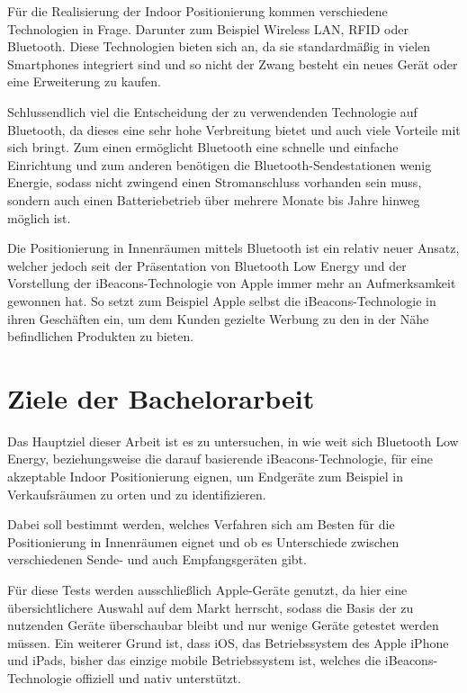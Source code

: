 Für die Realisierung der Indoor Positionierung kommen verschiedene Technologien in Frage. Darunter zum Beispiel Wireless LAN, RFID oder Bluetooth.
Diese Technologien bieten sich an, da sie standardmäßig in vielen Smartphones integriert sind und so nicht der Zwang besteht ein neues Gerät oder eine Erweiterung zu kaufen.


Schlussendlich viel die Entscheidung der zu verwendenden Technologie auf Bluetooth, da dieses eine sehr hohe Verbreitung bietet und auch viele Vorteile mit sich bringt. Zum einen ermöglicht Bluetooth eine schnelle und einfache Einrichtung und zum anderen benötigen die Bluetooth-Sendestationen wenig Energie, sodass nicht zwingend einen Stromanschluss vorhanden sein muss, sondern auch einen Batteriebetrieb über mehrere Monate bis Jahre hinweg möglich ist.

Die Positionierung in Innenräumen mittels Bluetooth ist ein relativ neuer Ansatz, welcher jedoch seit der Präsentation von Bluetooth Low Energy und der Vorstellung der iBeacons-Technologie von Apple immer mehr an Aufmerksamkeit gewonnen hat. So setzt zum Beispiel Apple selbst die iBeacons-Technologie in ihren Geschäften ein, um dem Kunden gezielte Werbung zu den in der Nähe befindlichen Produkten zu bieten.

\section{Ziele der Bachelorarbeit}
\label{sec:introduction:goal}


Das Hauptziel dieser Arbeit ist es zu untersuchen, in wie weit sich Bluetooth Low Energy, beziehungsweise die darauf basierende iBeacons-Technologie, für eine akzeptable Indoor Positionierung eignen, um Endgeräte zum Beispiel in Verkaufsräumen zu orten und zu identifizieren.

Dabei soll bestimmt werden, welches Verfahren sich am Besten für die Positionierung in Innenräumen eignet und ob es Unterschiede zwischen verschiedenen Sende- und auch Empfangsgeräten gibt.

Für diese Tests werden ausschließlich Apple-Geräte genutzt, da hier eine übersichtlichere Auswahl auf dem Markt herrscht, sodass die Basis der zu nutzenden Geräte überschaubar bleibt und nur wenige Geräte getestet werden müssen. Ein weiterer Grund ist, dass iOS, das Betriebssystem des Apple iPhone und iPads, bisher das einzige mobile Betriebssystem ist, welches die iBeacons-Technologie offiziell und nativ unterstützt.

